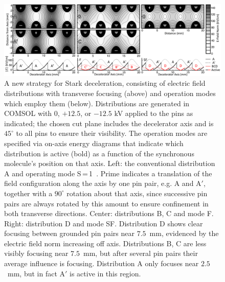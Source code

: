 \documentclass[%
 reprint,
 amsmath,amssymb,
 aps,
prl,
]{revtex4-1}
\begin{document}
\begin{figure}[t!]
\includegraphics[width=\linewidth]{Configurations/pinpairformal5.png}%
\vspace{-2mm}
\caption{
A new strategy for Stark deceleration, consisting of electric field distributions with transverse focusing (above) and operation modes which employ them (below). 
Distributions are generated in COMSOL with $0$, $+12.5$, or $-12.5$ kV applied to the pins as indicated; the chosen cut plane includes the decelerator axis and is $45^\circ$ to all pins to ensure their visibility.
The operation modes are specified via on-axis energy diagrams that indicate which distribution is active (bold) as a function of the synchronous molecule's position on that axis.
Left: the conventional distribution A and operating mode S\,=\,1~\cite{VanDeMeerakker2005a}.
Prime indicates a translation of the field configuration along the axis by one pin pair, e.g. A and A$'$, together with a $90^\circ$ rotation about that axis, since successive pin pairs are always rotated by this amount to ensure confinement in both transverse directions.
Center: distributions B, C and mode F.
Right: distribution D and mode SF.
Distribution D shows clear focusing between grounded pin pairs near $7.5$~mm, evidenced by the electric field norm increasing off axis.
Distributions B, C are less visibly focusing near $7.5$~mm, but after several pin pairs their average influence is focusing.
Distribution A only focuses near $2.5$~mm, but in fact A$'$ is active in this region.
\vspace{-4mm}
}
\label{fig:chargecartoon}
\end{figure}
\end{document}
